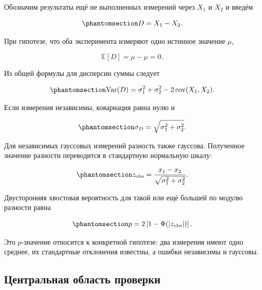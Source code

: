 \documentclass[
  russian,
  11pt,
  a4paper,
  open=any]{scrbook}
\begin{document}
Обозначим результаты ещё не выполненных измерений через \(X_1\) и
\(X_2\) и введём

\begin{equation}\protect\phantomsection\label{eq-measurement-difference}{
D=X_1-X_2.
}\end{equation}

При гипотезе, что оба эксперимента измеряют одно истинное значение
\(\mu\),

\[
\mathbb E[D]=\mu-\mu=0.
\]

Из общей формулы для дисперсии суммы следует

\begin{equation}\protect\phantomsection\label{eq-measurement-difference-variance}{
\operatorname{Var}(D)
=\sigma_1^2+\sigma_2^2
-2\operatorname{cov}(X_1,X_2).
}\end{equation}

Если измерения независимы, ковариация равна нулю и

\begin{equation}\protect\phantomsection\label{eq-independent-difference-uncertainty}{
\sigma_D=\sqrt{\sigma_1^2+\sigma_2^2}.
}\end{equation}

Для независимых гауссовых измерений разность также гауссова. Полученное
значение разности переводится в стандартную нормальную шкалу:

\begin{equation}\protect\phantomsection\label{eq-measurement-compatibility-z}{
z_{\mathrm{obs}}
=\frac{x_1-x_2}{\sqrt{\sigma_1^2+\sigma_2^2}}.
}\end{equation}

Двусторонняя хвостовая вероятность для такой или ещё большей по модулю
разности равна

\begin{equation}\protect\phantomsection\label{eq-measurement-compatibility-pvalue}{
p=2\left[1-\Phi\!\left(|z_{\mathrm{obs}}|\right)\right].
}\end{equation}

Это \(p\)-значение относится к конкретной гипотезе: два измерения имеют
одно среднее, их стандартные отклонения известны, а ошибки независимы и
гауссовы.

\subsection{Центральная область
проверки}\label{ux446ux435ux43dux442ux440ux430ux43bux44cux43dux430ux44f-ux43eux431ux43bux430ux441ux442ux44c-ux43fux440ux43eux432ux435ux440ux43aux438}
\end{document}
